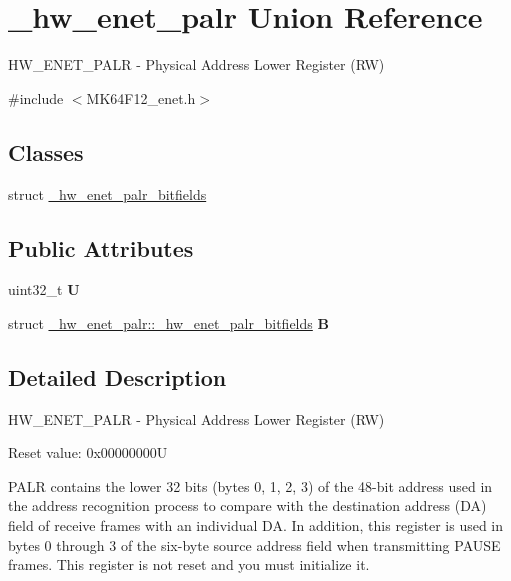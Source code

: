 \hypertarget{union__hw__enet__palr}{}\section{\+\_\+hw\+\_\+enet\+\_\+palr Union Reference}
\label{union__hw__enet__palr}


H\+W\+\_\+\+E\+N\+E\+T\+\_\+\+P\+A\+LR -\/ Physical Address Lower Register (RW)  




{\ttfamily \#include $<$M\+K64\+F12\+\_\+enet.\+h$>$}

\subsection*{Classes}
\begin{DoxyCompactItemize}
\item 
struct \hyperlink{struct__hw__enet__palr_1_1__hw__enet__palr__bitfields}{\+\_\+hw\+\_\+enet\+\_\+palr\+\_\+bitfields}
\end{DoxyCompactItemize}
\subsection*{Public Attributes}
\begin{DoxyCompactItemize}
\item 
uint32\+\_\+t {\bfseries U}\hypertarget{union__hw__enet__palr_a05a5a6a80db25392f28d6b1bc2068e9f}{}\label{union__hw__enet__palr_a05a5a6a80db25392f28d6b1bc2068e9f}

\item 
struct \hyperlink{struct__hw__enet__palr_1_1__hw__enet__palr__bitfields}{\+\_\+hw\+\_\+enet\+\_\+palr\+::\+\_\+hw\+\_\+enet\+\_\+palr\+\_\+bitfields} {\bfseries B}\hypertarget{union__hw__enet__palr_a5e9bf8ae367d4c7b78c9b427772a2110}{}\label{union__hw__enet__palr_a5e9bf8ae367d4c7b78c9b427772a2110}

\end{DoxyCompactItemize}


\subsection{Detailed Description}
H\+W\+\_\+\+E\+N\+E\+T\+\_\+\+P\+A\+LR -\/ Physical Address Lower Register (RW) 

Reset value\+: 0x00000000U

P\+A\+LR contains the lower 32 bits (bytes 0, 1, 2, 3) of the 48-\/bit address used in the address recognition process to compare with the destination address (DA) field of receive frames with an individual DA. In addition, this register is used in bytes 0 through 3 of the six-\/byte source address field when transmitting P\+A\+U\+SE frames. This register is not reset and you must initialize it. 

